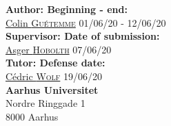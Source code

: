 \begin{titlepage}
\vspace*{+0.4in}
\begin{minipage}[l]{1\textwidth}
\begin{flushleft} \large

\textbf{Author: \hfill \large Beginning - end:}\\
 \href{mailto:colin.guetemme@live.fr}{Colin \textsc{Guétemme}} \hfill 01/06/20 - 12/06/20 \\[0.4cm] %

\textbf{Supervisor: \hfill \large Date of submission:} \\
 \href{mailto:asger@au.dk}{Asger \textsc{Hobolth}} \hfill 07/06/20\\[0.4cm]

\textbf{Tutor: \hfill \large Defense date:} \\
\href{mailto:cedric.wolf@univ-rennes1.fr}{Cédric \textsc{Wolf}} \hfill 19/06/20 \\[0.4cm]

\textbf{Aarhus Universitet} \\
Nordre Ringgade 1\\
8000 Aarhus\\
\end{flushleft}
\end{minipage}
~







 

\vfill %

\end{titlepage}

